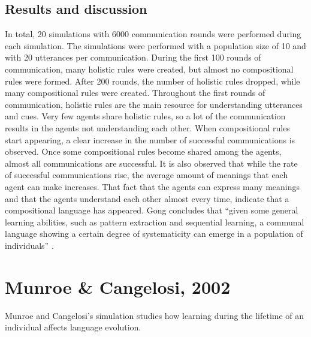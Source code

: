 \subsection{Results and discussion}
In total, 20 simulations with 6000 communication rounds were performed during each simulation. The simulations were performed with a population size of 10 and with 20 utterances per communication. During the first 100 rounds of communication, many holistic rules were created, but almost no compositional rules were formed. After 200 rounds, the number of holistic rules dropped, while many compositional rules were created. Throughout the first rounds of communication, holistic rules are the main resource for understanding utterances and cues. Very few agents share holistic rules, so a lot of the communication results in the agents not understanding each other. When compositional rules start appearing, a clear increase in the number of successful communications is observed. Once some compositional rules become shared among the agents, almost all communications are successful. It is also observed that while the rate of successful communications rise, the average amount of meanings that each agent can make increases. That fact that the agents can express many meanings and that the agents understand each other almost every time, indicate that a compositional language has appeared. 
Gong concludes that ``given some general learning abilities, such as pattern extraction and sequential learning, a communal language showing a certain degree of systematicity can emerge in a population of individuals'' \citep[chapter 6]{gong2011simulating}.


\section{Munroe \& Cangelosi, 2002}\label{sec:Munroe}
Munroe and Cangelosi's simulation \citep{munroe2002learning} studies how learning during the lifetime of an individual affects language evolution.

